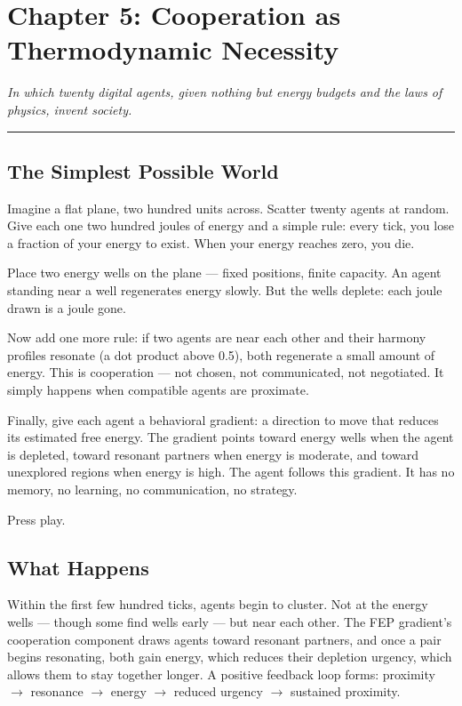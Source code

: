 \chapter{Chapter 5: Cooperation as Thermodynamic Necessity}\label{chapter-5-cooperation-as-thermodynamic-necessity}

\emph{In which twenty digital agents, given nothing but energy budgets and the laws of physics, invent society.}

\begin{center}\rule{0.5\linewidth}{0.5pt}\end{center}

\section{The Simplest Possible World}\label{the-simplest-possible-world}

Imagine a flat plane, two hundred units across. Scatter twenty agents at random. Give each one two hundred joules of energy and a simple rule: every tick, you lose a fraction of your energy to exist. When your energy reaches zero, you die.

Place two energy wells on the plane --- fixed positions, finite capacity. An agent standing near a well regenerates energy slowly. But the wells deplete: each joule drawn is a joule gone.

Now add one more rule: if two agents are near each other and their harmony profiles resonate (a dot product above 0.5), both regenerate a small amount of energy. This is cooperation --- not chosen, not communicated, not negotiated. It simply happens when compatible agents are proximate.

Finally, give each agent a behavioral gradient: a direction to move that reduces its estimated free energy. The gradient points toward energy wells when the agent is depleted, toward resonant partners when energy is moderate, and toward unexplored regions when energy is high. The agent follows this gradient. It has no memory, no learning, no communication, no strategy.

Press play.

\section{What Happens}\label{what-happens}

Within the first few hundred ticks, agents begin to cluster. Not at the energy wells --- though some find wells early --- but near each other. The FEP gradient's cooperation component draws agents toward resonant partners, and once a pair begins resonating, both gain energy, which reduces their depletion urgency, which allows them to stay together longer. A positive feedback loop forms: proximity $\to$ resonance $\to$ energy $\to$ reduced urgency $\to$ sustained proximity.

